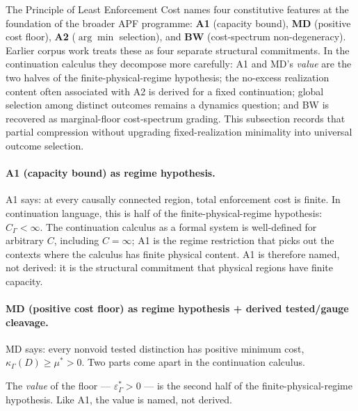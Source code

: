 \documentclass[11pt]{article}
\theoremstyle{remark}
\newcommand{\G}{\Gamma}
\newcommand{\Cost}{\kappa}
\newcommand{\floor}{\varepsilon^{\!*}_{\G}}
\begin{document}
The Principle of Least Enforcement Cost names four constitutive features at the foundation of the broader APF programme: \textbf{A1} (capacity bound), \textbf{MD} (positive cost floor), \textbf{A2} ($\arg\min$ selection), and \textbf{BW} (cost-spectrum non-degeneracy).  Earlier corpus work treats these as four separate structural commitments.  In the continuation calculus they decompose more carefully: A1 and MD's \emph{value} are the two halves of the finite-physical-regime hypothesis; the no-excess realization content often associated with A2 is derived for a fixed continuation; global selection among distinct outcomes remains a dynamics question; and BW is recovered as marginal-floor cost-spectrum grading.  This subsection records that partial compression without upgrading fixed-realization minimality into universal outcome selection.

\paragraph{A1 (capacity bound) as regime hypothesis.}
A1 says: at every causally connected region, total enforcement cost is finite.  In continuation language, this is half of the finite-physical-regime hypothesis: $C_\G < \infty$.  The continuation calculus as a formal system is well-defined for arbitrary $C$, including $C = \infty$; A1 is the regime restriction that picks out the contexts where the calculus has finite physical content.  A1 is therefore named, not derived: it is the structural commitment that physical regions have finite capacity.

\paragraph{MD (positive cost floor) as regime hypothesis + derived tested/gauge cleavage.}
MD says: every nonvoid tested distinction has positive minimum cost, $\Cost_\G(D) \ge \mu^* > 0$.  Two parts come apart in the continuation calculus.

The \emph{value} of the floor --- $\floor > 0$ --- is the second half of the finite-physical-regime hypothesis.  Like A1, the value is named, not derived.
\end{document}
